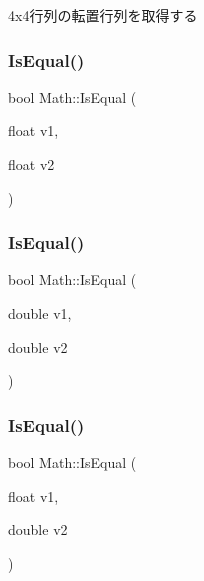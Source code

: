 4x4行列の転置行列を取得する 

\mbox{\label{namespace_math_a622cf93fd441b31963159cb086b01ff4}} 
\subsubsection{\texorpdfstring{Is\+Equal()}{IsEqual()}\hspace{0.1cm}{\footnotesize\ttfamily [1/4]}}
{\footnotesize\ttfamily bool Math\+::\+Is\+Equal (\begin{DoxyParamCaption}\item[{float}]{v1,  }\item[{float}]{v2 }\end{DoxyParamCaption})}

\mbox{\label{namespace_math_a298771bf90fda8152d34b6fd004d1c7f}} 
\subsubsection{\texorpdfstring{Is\+Equal()}{IsEqual()}\hspace{0.1cm}{\footnotesize\ttfamily [2/4]}}
{\footnotesize\ttfamily bool Math\+::\+Is\+Equal (\begin{DoxyParamCaption}\item[{double}]{v1,  }\item[{double}]{v2 }\end{DoxyParamCaption})}

\mbox{\label{namespace_math_aa9851c5508417d12ef139ebbe943f6a7}} 
\subsubsection{\texorpdfstring{Is\+Equal()}{IsEqual()}\hspace{0.1cm}{\footnotesize\ttfamily [3/4]}}
{\footnotesize\ttfamily bool Math\+::\+Is\+Equal (\begin{DoxyParamCaption}\item[{float}]{v1,  }\item[{double}]{v2 }\end{DoxyParamCaption})}

